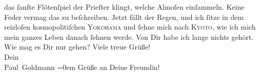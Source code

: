\begin{ledgroupsized}[t]{13cm}
               das ſanfte Flötenſpiel der Prieſter klingt, welche Almoſen einſammeln. Keine Feder
               vermag das zu beſchreiben. Jetzt fällt der Regen, und ich ſitze in dem reizloſen
               kosmopolitiſchen \textsc{Yokohama} und ſehne mich nach \textsc{Kyoto}, wie ich mich mein ganzes Leben danach ſehnen werde.\pend
           \pstart
           Von Dir habe ich lange nichts gehört. Wie mag es Dir nur gehen?\pend
           \pstart
           Viele treue Grüße! {\\[\baselineskip]}Dein {\\[\baselineskip]}\spacefill\mbox{Paul Goldmann}\pend
           \leftskip=0em{}\pstart
           \noindent{}Grüße an Deine Freundin!\pend
           
         
         \endnumbering{}\end{ledgroupsized}  \newcommand{\dateiname}{L02864}\newcommand{\titel}{Paul Goldmann an Arthur Schnitzler, 3. 11. [1898]}\newcommand{\editorInnen}{Martin Anton Müller und Laura Untner}
      